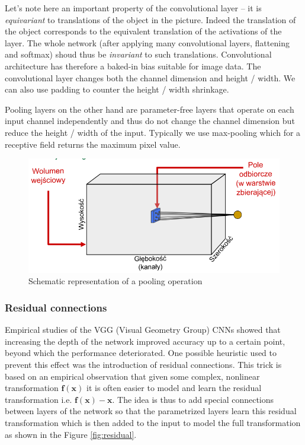 \documentclass[a5paper]{article}
\begin{document}
Let's note here an important property of the convolutional layer -- it is \emph{equivariant} to
translations of the object in the picture. Indeed the translation of the object corresponds to the
equivalent translation of the activations of the layer. The whole network (after applying many
convolutional layers, flattening and softmax) shoud thus be \emph{invariant} to such translations.
Convolutional architecture has therefore a baked-in bias suitable for image data. The convolutional
layer changes both the channel dimension and height / width. We can also use padding to counter the
height / width shrinkage. 

Pooling layers on the other hand are parameter-free layers that operate on each input channel
independently and thus do not change the channel dimension but reduce the height / width of the
input. Typically we use max-pooling which for a receptive field returns the maximum pixel value.

\begin{figure}[ht]
   \centering
   \includegraphics[width=0.8\columnwidth]{figs/maxpool.png}
   \caption{Schematic representation of a pooling operation \cite{Kurdziel}}
   \label{fig:pool}
\end{figure}

\subsubsection{Residual connections}

Empirical studies of the VGG (Visual Geometry Group) CNNs showed that increasing the depth of the
network improved accuracy up to a certain point, beyond which the performance deteriorated. One
possible heuristic used to prevent this effect was the introduction of residual connections. This
trick is based on an empirical observation that given some complex, nonlinear transformation
$\bm{f}(\bm{x})$ it is often easier to model and learn the residual transformation i.e.
$\bm{f}(\bm{x}) - \bm{x}$. The idea is thus to add special connections between layers of the network
so that the parametrized layers learn this residual transformation which is then added to the input
to model the full transformation as shown in the Figure \ref{fig:residual}.
\end{document}
